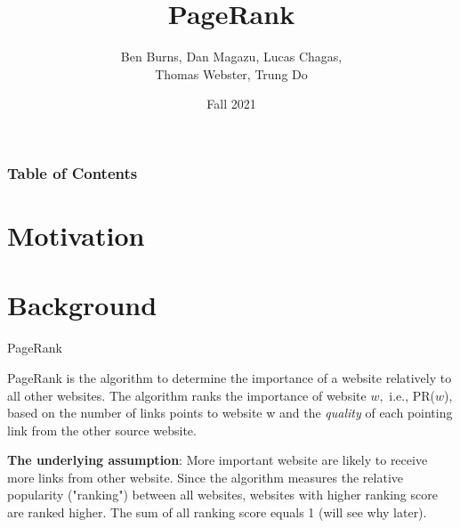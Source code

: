 \documentclass{beamer}
\title{PageRank}
\author{Ben Burns, Dan Magazu, Lucas Chagas, \\Thomas Webster, Trung Do}
\date{Fall 2021}
\begin{document}
\frame{\titlepage}

\begin{frame}
\frametitle{Table of Contents}
\tableofcontents
\end{frame}

\section{Motivation}

\section{Background}
\begin{frame}[t]{PageRank}
\begin{outline}
    \1 PageRank is the algorithm to determine the importance of a website relatively to all other websites. The algorithm ranks the importance of website $w,$ i.e., PR($w$), based on the number of links points to website w and the \emph{quality} of each pointing link from the other source website. 

    \1 \textbf{The underlying assumption}: More important website are likely to receive more links from other website. Since the algorithm measures the relative popularity ("ranking") between all websites, websites with higher ranking score are ranked higher. The sum of all ranking score equals 1 (will see why later).
\end{outline}
\end{frame}
\end{document}
